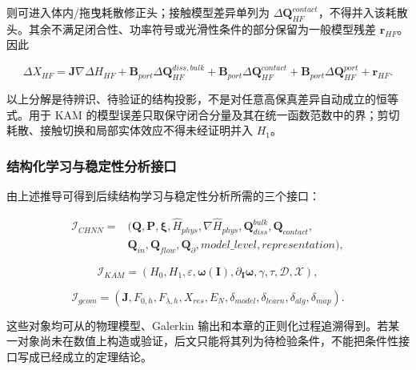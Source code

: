则可进入体内/拖曳耗散修正头；接触模型差异单列为 \(\Delta\mathbf{Q}_{HF}^{contact}\)，不得并入该耗散头。其余不满足闭合性、功率符号或光滑性条件的部分保留为一般模型残差 \(\mathbf{r}_{HF}\)。因此

\begin{equation}
\label{eq:hamiltonian-3-101}
\boxed{\Delta X_{HF} = \mathbf{J}\nabla\Delta H_{HF} + \mathbf{B}_{port}\Delta\mathbf{Q}_{HF}^{diss,bulk} + \mathbf{B}_{port}\Delta\mathbf{Q}_{HF}^{contact} + \mathbf{B}_{port}\Delta\mathbf{Q}_{HF}^{port} + \mathbf{r}_{HF}.}
\end{equation}

以上分解是待辨识、待验证的结构投影，不是对任意高保真差异自动成立的恒等式。用于 KAM 的模型误差只取保守闭合分量及其在统一函数范数中的界；剪切耗散、接触切换和局部实体效应不得未经证明并入 \(H_{1}\)。

\subsubsection{结构化学习与稳定性分析接口}\label{sec:hamiltonian-3-7-7}

由上述推导可得到后续结构学习与稳定性分析所需的三个接口：

\begin{equation}
\label{eq:hamiltonian-3-102}
\begin{aligned}
\mathcal{I}_{CHNN}={}&\bigl(\mathbf{Q},\mathbf{P},\bm{\xi},{\widehat{H}}_{phys},\nabla{\widehat{H}}_{phys},\mathbf{Q}_{diss}^{bulk},\mathbf{Q}_{contact},\\
&\mathbf{Q}_{in},\mathbf{Q}_{flow},\mathbf{Q}_{\partial},model\_ level,representation\bigr),
\end{aligned}
\end{equation}

\begin{equation}
\label{eq:hamiltonian-3-103}
\mathcal{I}_{KAM} = \left( H_{0},H_{1},\varepsilon,\bm{\omega}\left( \mathbf{I} \right),\partial_{\mathbf{I}}\bm{\omega},\gamma,\tau,\mathcal{D},\mathcal{X} \right),
\end{equation}

\begin{equation}
\label{eq:hamiltonian-3-104}
\mathcal{I}_{geom} = \left( \mathbf{J},F_{0,h},F_{\lambda,h},X_{res},E_{N},\delta_{model},\delta_{learn},\delta_{alg},\delta_{map} \right).
\end{equation}

这些对象均可从的物理模型、Galerkin 输出和本章的正则化过程追溯得到。若某一对象尚未在数值上构造或验证，后文只能将其列为待检验条件，不能把条件性接口写成已经成立的定理结论。

